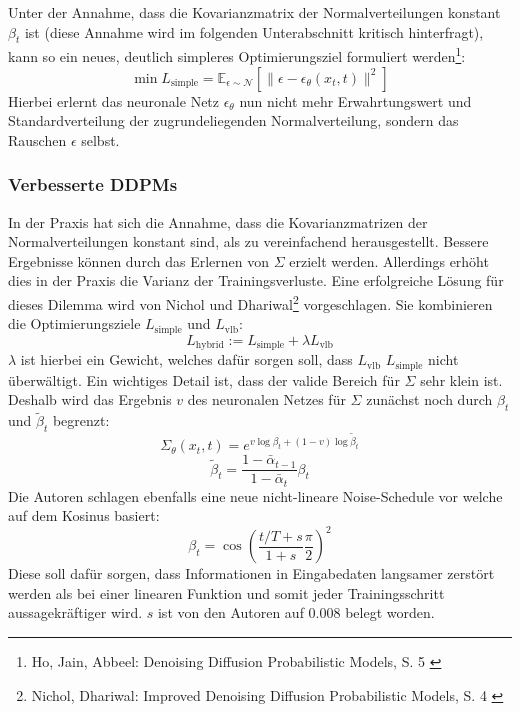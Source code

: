 Unter der Annahme, dass die Kovarianzmatrix der Normalverteilungen konstant $\beta_t$ ist (diese Annahme wird im folgenden Unterabschnitt kritisch hinterfragt), kann so ein neues, deutlich simpleres Optimierungsziel formuliert werden\footnote{
    Ho, Jain, Abbeel: Denoising Diffusion Probabilistic Models, S. 5
    \cite{ho2020denoisingdiffusionprobabilisticmodels}
}: 
\begin{equation}
    \min L_\text{simple} = \mathbb E_{\epsilon \sim \mathcal N}
    \left [
        \| \epsilon - \epsilon_\theta(x_{t}, t) \|^2
    \right ]
\end{equation}
Hierbei erlernt das neuronale Netz $\epsilon_\theta$ nun nicht mehr Erwahrtungswert und Standardverteilung der zugrundeliegenden Normalverteilung, sondern das Rauschen $\epsilon$ selbst. 

\subsubsection{Verbesserte DDPMs}

In der Praxis hat sich die Annahme, dass die Kovarianzmatrizen der Normalverteilungen konstant sind, als zu vereinfachend herausgestellt. Bessere Ergebnisse können durch das Erlernen von $\Sigma$ erzielt werden. Allerdings erhöht dies in der Praxis die Varianz der Trainingsverluste. Eine erfolgreiche Lösung für dieses Dilemma wird von Nichol und Dhariwal\footnote{
    Nichol, Dhariwal: Improved Denoising Diffusion Probabilistic Models, S. 4
    \cite{nichol2021improveddenoisingdiffusionprobabilistic}
} vorgeschlagen. Sie kombinieren die Optimierungsziele $L_\text{simple}$ und $L_\text{vlb}$:
\begin{equation}
    L_\text{hybrid} := L_\text{simple} + \lambda L_\text{vlb}
\end{equation}
$\lambda$ ist hierbei ein Gewicht, welches dafür sorgen soll, dass $L_\text{vlb}$ $L_\text{simple}$ nicht überwältigt. Ein wichtiges Detail ist, dass der valide Bereich für $\Sigma$ sehr klein ist. Deshalb wird das Ergebnis $v$ des neuronalen Netzes für $\Sigma$ zunächst noch durch $\beta_t$ und $\tilde \beta_t$ begrenzt:
\begin{equation}
    \Sigma_\theta(x_t, t) = e^{v \log \beta_t + (1 - v) \log \tilde \beta_t}
\end{equation}
\begin{equation}
    \tilde \beta_t = \frac{1-\bar \alpha_{t-1}} {1-\bar \alpha_{t}} \beta_t
\end{equation}
Die Autoren schlagen ebenfalls eine neue nicht-lineare Noise-Schedule vor welche auf dem Kosinus basiert: 
\begin{equation}
    \beta_t = \cos \left ( 
        \frac{t/T+s}{1+s} \frac{\pi}{2}
    \right )^2
\end{equation}
Diese soll dafür sorgen, dass Informationen in Eingabedaten langsamer zerstört werden als bei einer linearen Funktion und somit jeder Trainingsschritt aussagekräftiger wird. $s$ ist von den Autoren auf 0.008 belegt worden.

